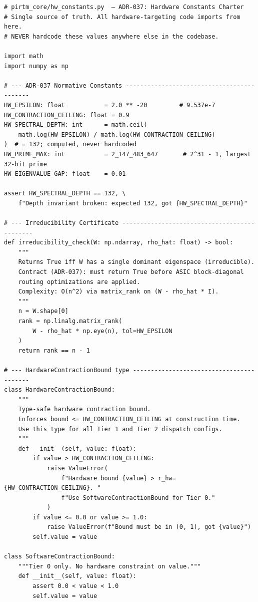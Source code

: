 \documentclass[12pt,letterpaper]{article}
\theoremstyle{plain}
\theoremstyle{definition}
\theoremstyle{remark}
\begin{document}
\begin{lstlisting}[style=pythonstyle, caption={\texttt{pirtm\_core/hw\_constants.py} --- ADR-037 normative constants}, label=lst:constants]
# pirtm_core/hw_constants.py  — ADR-037: Hardware Constants Charter
# Single source of truth. All hardware-targeting code imports from here.
# NEVER hardcode these values anywhere else in the codebase.

import math
import numpy as np

# --- ADR-037 Normative Constants -------------------------------------------
HW_EPSILON: float           = 2.0 ** -20         # 9.537e-7
HW_CONTRACTION_CEILING: float = 0.9
HW_SPECTRAL_DEPTH: int      = math.ceil(
    math.log(HW_EPSILON) / math.log(HW_CONTRACTION_CEILING)
)  # = 132; computed, never hardcoded
HW_PRIME_MAX: int           = 2_147_483_647       # 2^31 - 1, largest 32-bit prime
HW_EIGENVALUE_GAP: float    = 0.01

assert HW_SPECTRAL_DEPTH == 132, \
    f"Depth invariant broken: expected 132, got {HW_SPECTRAL_DEPTH}"

# --- Irreducibility Certificate ---------------------------------------------
def irreducibility_check(W: np.ndarray, rho_hat: float) -> bool:
    """
    Returns True iff W has a single dominant eigenspace (irreducible).
    Contract (ADR-037): must return True before ASIC block-diagonal
    routing optimizations are applied.
    Complexity: O(n^2) via matrix_rank on (W - rho_hat * I).
    """
    n = W.shape[0]
    rank = np.linalg.matrix_rank(
        W - rho_hat * np.eye(n), tol=HW_EPSILON
    )
    return rank == n - 1

# --- HardwareContractionBound type -----------------------------------------
class HardwareContractionBound:
    """
    Type-safe hardware contraction bound.
    Enforces bound <= HW_CONTRACTION_CEILING at construction time.
    Use this type for all Tier 1 and Tier 2 dispatch configs.
    """
    def __init__(self, value: float):
        if value > HW_CONTRACTION_CEILING:
            raise ValueError(
                f"Hardware bound {value} > r_hw={HW_CONTRACTION_CEILING}. "
                f"Use SoftwareContractionBound for Tier 0."
            )
        if value <= 0.0 or value >= 1.0:
            raise ValueError(f"Bound must be in (0, 1), got {value}")
        self.value = value

class SoftwareContractionBound:
    """Tier 0 only. No hardware constraint on value."""
    def __init__(self, value: float):
        assert 0.0 < value < 1.0
        self.value = value
\end{lstlisting}
\end{document}
